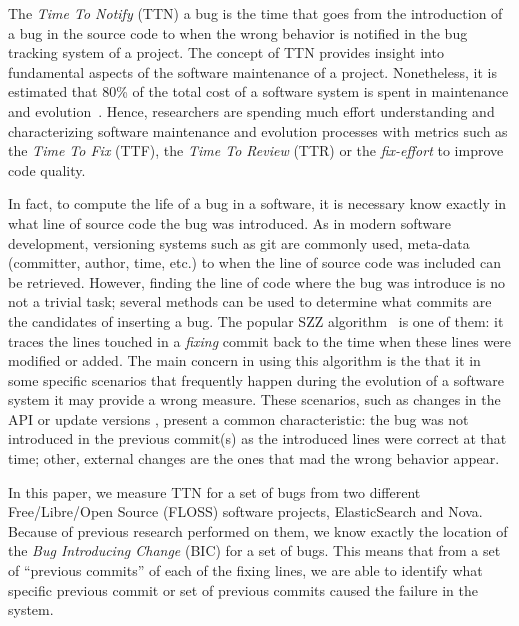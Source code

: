 \documentclass[10pt, conference]{IEEEtran}
\begin{document}
The \emph{Time To Notify} (TTN) a bug is the time that goes from the introduction of a bug in the source code to when the wrong behavior is notified in the bug tracking system of a project. The concept of TTN provides insight into fundamental aspects of the software maintenance of a project. Nonetheless, it is estimated that 80\% of the total cost of a software system is spent in maintenance and evolution~\cite{tassey2002economic}. Hence, researchers are spending much effort understanding and characterizing software maintenance and evolution processes with metrics such as the \emph{Time To Fix} (TTF), the \emph{Time To Review} (TTR) or the \emph{fix-effort} to improve code quality. 

In fact, to compute the life of a bug in a software, it is necessary know exactly in what line of source code the bug was introduced. As in modern software development, versioning systems such as git are commonly used, meta-data (committer, author, time, etc.) to when the line of source code was included can be retrieved. However, finding the line of code where the bug was introduce is no not a trivial task; several methods can be used to determine what commits are the candidates of inserting a bug. The popular SZZ algorithm~\cite{sliwerski2005changes} is one of them: it traces the lines touched in a \emph{fixing} commit back to the time when these lines were modified or added. The main concern in using this algorithm is the that it in some specific scenarios that frequently happen during the evolution of a software system it may provide a wrong measure. These scenarios, such as changes in the API or update versions , present a common characteristic: the bug was not introduced in the  previous commit(s) as the introduced lines were correct at that time; other, external changes are the ones that mad the wrong behavior appear. 


In this paper, we measure TTN for a set of bugs from two different Free/Libre/Open Source (FLOSS) software projects, ElasticSearch and Nova. Because of previous research performed on them, we know exactly the location of the \emph{Bug Introducing Change} (BIC) for a set of bugs. This means that from a set of ``previous commits'' of each of the fixing lines, we are able to identify what specific previous commit or set of previous commits caused the failure in the system.
\end{document}
